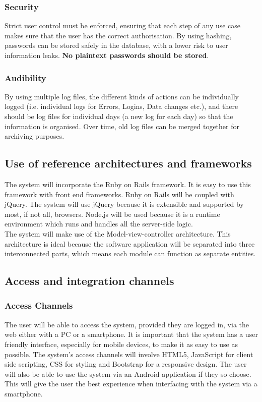 \documentclass{article}
\begin{document}
			\subsubsection{Security}
				Strict user control must be enforced, ensuring that each step of any use case makes sure that the user has the correct authorisation. By using hashing, passwords can be stored safely in the database, with a lower risk to user information leaks. \textbf{No plaintext passwords should be stored}.
			\subsubsection{Audibility}
				By using multiple log files, the different kinds of actions can be individually logged (i.e. individual logs for Errors, Logins, Data changes etc.), and there should be log files for individual days (a new log for each day) so that the information is organised. Over time, old log files can be merged together for archiving purposes.

		\subsection{Use of reference architectures and frameworks}
				The system will incorporate the Ruby on Rails framework. It is easy to use this framework with front end frameworks. Ruby on Rails will be coupled with jQuery. The system will use jQuery because it is extensible and supported by most, if not all, browsers. Node.js will be used because it is a runtime environment which runs and handles all the server-side logic.\\
				
				The system will make use of the Model-view-controller architecture. This architecture is ideal because the software application will be separated into three interconnected parts, which means each module can function as separate entities.
		\subsection{Access and integration channels}
			\subsubsection{Access Channels}
				The user will be able to access the system, provided they are logged in, via the web either with a PC or a smartphone.
				It is important that the system has a user friendly interface, especially for mobile devices, to make it as easy to use as possible.
				The system's access channels will involve HTML5, JavaScript for client side scripting, CSS for styling and Bootstrap for a responsive design.
				The user will also be able to use the system via an Android application if they so choose. This will give the user the best experience when interfacing with the system 				via a smartphone.
\end{document}

